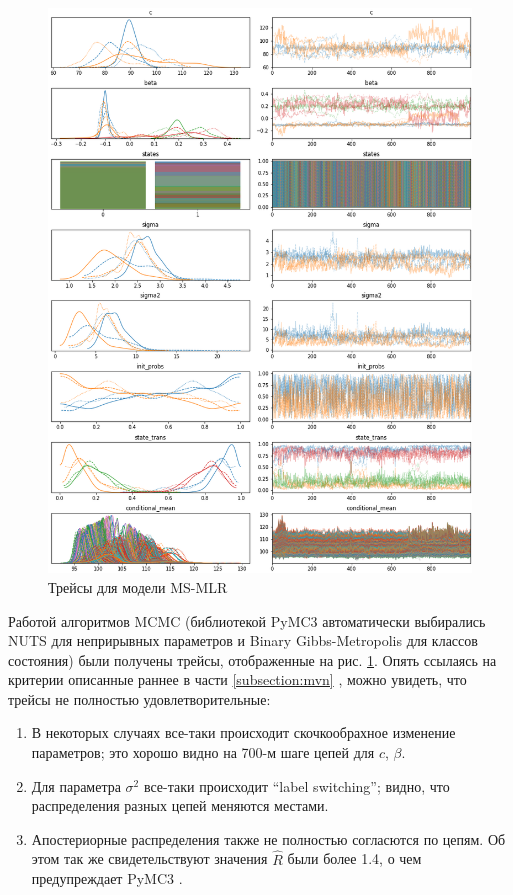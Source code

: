 \documentclass[a4paper,14pt]{extreport}
\begin{document}
\begin{figure}[H]
	\includegraphics[width=\linewidth]{img/gen/pp_ms_arx_trace.png}
	\caption{Трейсы для модели MS-MLR}
	\label{fig:pp_ms_arx_trace}
\end{figure}

Работой алгоритмов MCMC (библиотекой PyMC3 автоматически выбирались NUTS \cite{nuts_hoffman_gelman} для неприрывных параметров и Binary Gibbs-Metropolis \cite{pymc3_2016} для классов состояния) были получены трейсы, отображенные на рис. \ref{fig:pp_ms_arx_trace}. Опять ссылаясь на критерии описанные раннее в части \ref{subsection:mvn} \cite{stan_user_guide}, можно увидеть, что трейсы не полностью удовлетворительные: 

\begin{enumerate}
	\item В некоторых случаях все-таки происходит скочкообрахное изменение параметров; это хорошо видно на 700-м шаге цепей для $c$, $\beta$.
	\item Для параметра $\sigma^2$ все-таки происходит ``label switching''; видно, что распределения разных цепей меняются местами.
	\item Апостериорные распределения также не полностью согласются по цепям. Об этом так же свидетельствуют значения $\hat{R}$ были более 1.4, о чем предупреждает PyMC3 \cite{pymc3_2016,nuts_hoffman_gelman}.
\end{enumerate}
\end{document}

